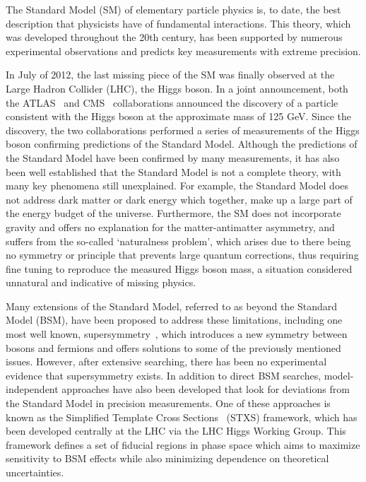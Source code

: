 The Standard Model (SM) of elementary particle physics is, to date, the best description that physicists have of fundamental interactions. This theory, which was developed throughout the
20th century, has been supported by numerous experimental observations and predicts key measurements with extreme precision. 

In July of 2012, the last missing piece of the SM was finally observed at the Large Hadron Collider (LHC), the Higgs boson. In a joint announcement, both the ATLAS~\cite{ATLAS_Higgs_discovery} and CMS~\cite{CMS_Higgs_discovery} collaborations announced the discovery of a particle consistent with the Higgs boson at the approximate mass of
125 GeV. Since the discovery, the two collaborations performed a series of measurements of the Higgs boson confirming predictions of the Standard Model. Although the predictions of the Standard Model have been confirmed by many measurements, it has also been well established that the Standard Model is not a complete theory, with many key phenomena still unexplained. 
For example, the Standard Model does not address dark matter or dark energy which together, make up a large part of the energy budget of the universe. Furthermore, the SM does not incorporate gravity and offers no explanation for the matter-antimatter asymmetry, and suffers from the so-called `naturalness problem', which arises due to there being no symmetry or principle that prevents large quantum corrections, thus requiring fine tuning to reproduce the measured Higgs boson mass, a situation considered unnatural and indicative of missing physics.

Many extensions of the Standard Model, referred to as beyond the Standard Model (BSM), have been proposed to address these limitations, including one most well known, supersymmetry~\cite{MARTIN_1998}, which introduces a new symmetry between bosons and fermions and offers solutions to some of the previously mentioned issues. However, after extensive searching, there has been no experimental evidence that supersymmetry exists.
In addition to direct BSM searches, model-independent approaches have also been developed that look for deviations from the Standard Model in precision measurements. One of these approaches is known as the Simplified Template Cross Sections~\cite{STXS_1_1} (STXS) framework, which has been developed centrally at the LHC via the LHC Higgs Working Group. This framework defines a set of fiducial regions in phase space which aims to maximize sensitivity to BSM effects while also minimizing dependence on theoretical uncertainties.

